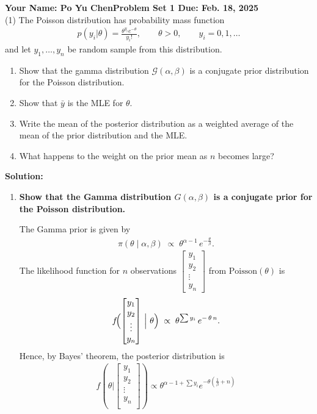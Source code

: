 \documentclass[final,11pt]{article}
\begin{document}
\thispagestyle{empty}
\begin{spacing}{1.25}

\textbf{Your Name: Po Yu Chen\hfill Problem Set 1 Due: Feb. 18, 2025}\\

(1) The Poisson distribution has probability mass function
\begin{gather}
    p(y_i|\theta)=\frac{\theta^{y_i}e^{-\theta}}{y_i!},\qquad \theta>0,\qquad y_i=0,1,\ldots
\end{gather}
and let $y_1,\ldots,y_n$ be random sample from this distribution.
\begin{enumerate}
    \item Show that the gamma distribution $\mathcal{G}(\alpha,\beta)$ is a conjugate prior distribution for the Poisson distribution.
    \item Show that $\bar{y}$ is the MLE for $\theta$.
    \item Write the mean of the posterior distribution as a weighted average of the mean of the prior distribution and the MLE.
    \item What happens to the weight on the prior mean as $n$ becomes large?
\end{enumerate}

{
\textbf{Solution:}
\begin{enumerate}
    \item \textbf{Show that the Gamma distribution $G(\alpha, \beta)$ is a conjugate prior for the Poisson distribution.}

    The Gamma prior is given by
    \begin{gather}
        \pi(\theta \mid \alpha, \beta) \;\propto\; \theta^{\alpha - 1} \, e^{-\tfrac{\theta}{\beta}}.
    \end{gather}
    The likelihood function for $n$ observations $\begin{bmatrix} y_1 \\ y_2 \\ \vdots \\ y_n \end{bmatrix}$ from $\text{Poisson}(\theta)$ is
    \begin{gather}
        f\!\Bigl(\begin{bmatrix} y_1 \\ y_2 \\ \vdots \\ y_n \end{bmatrix} \,\Big|\ \theta\Bigr)
        \;\propto\;
        \theta^{\sum y_i}\,e^{-\,\theta\,n}.
    \end{gather}
    Hence, by Bayes' theorem, the posterior distribution is
    \begin{gather}
    f(    \theta | 
    \begin{bmatrix}
    y_1 \\
    y_2 \\
    \vdots \\
    y_n \\
    \end{bmatrix}) \propto \theta^{\alpha - 1 + \sum y_i}e^{-{\theta(\frac{1}{\beta} + n)}}
     \end{gather}


\end{enumerate}}
\end{spacing}
\end{document}
